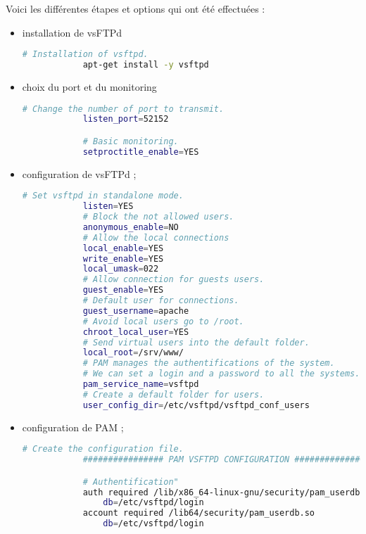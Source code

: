 Voici les différentes étapes et options qui ont été effectuées :
\begin{itemize}
    \item installation de vsFTPd

        \begin{lstlisting}[language=bash]
            # Installation of vsftpd.
            apt-get install -y vsftpd
        \end{lstlisting}

    \item choix du port et du monitoring

        \begin{lstlisting}[language=bash]
            # Change the number of port to transmit.
            listen_port=52152

            # Basic monitoring.
            setproctitle_enable=YES
        \end{lstlisting}

    \newpage
    \item configuration de vsFTPd ;

        \begin{lstlisting}[language=bash]
            # Set vsftpd in standalone mode.
            listen=YES
            # Block the not allowed users.
            anonymous_enable=NO
            # Allow the local connections
            local_enable=YES
            write_enable=YES
            local_umask=022
            # Allow connection for guests users.
            guest_enable=YES
            # Default user for connections.
            guest_username=apache
            # Avoid local users go to /root.
            chroot_local_user=YES
            # Send virtual users into the default folder.
            local_root=/srv/www/
            # PAM manages the authentifications of the system.
            # We can set a login and a password to all the systems.
            pam_service_name=vsftpd
            # Create a default folder for users.
            user_config_dir=/etc/vsftpd/vsftpd_conf_users
        \end{lstlisting}

    \item configuration de PAM ;

        \begin{lstlisting}[language=bash]
            # Create the configuration file.
            ################ PAM VSFTPD CONFIGURATION ###############

            # Authentification"
            auth required /lib/x86_64-linux-gnu/security/pam_userdb.so
                db=/etc/vsftpd/login
            account required /lib64/security/pam_userdb.so
                db=/etc/vsftpd/login
        \end{lstlisting}

\end{itemize}

